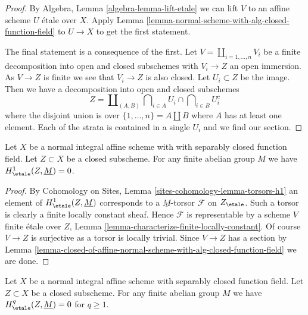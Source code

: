 \begin{proof}
By Algebra, Lemma \ref{algebra-lemma-lift-etale}
we can lift $V$ to an affine scheme $U$ \'etale over $X$.
Apply Lemma \ref{lemma-normal-scheme-with-alg-closed-function-field}
to $U \to X$ to get the first statement.

\medskip\noindent
The final statement is a consequence of the first.
Let $V = \coprod_{i = 1, \ldots, n} V_i$ be a finite
decomposition into open and
closed subschemes with $V_i \to Z$ an open immersion.
As $V \to Z$ is finite we see that $V_i \to Z$ is also closed.
Let $U_i \subset Z$ be the image. Then we have a decomposition
into open and closed subschemes
$$
Z =
\coprod\nolimits_{(A, B)}
\bigcap\nolimits_{i \in A} U_i \cap
\bigcap\nolimits_{i \in B} U_i^c
$$
where the disjoint union is over $\{1, \ldots, n\} = A \amalg B$
where $A$ has at least one element.
Each of the strata is contained in a single $U_i$ and
we find our section.
\end{proof}

\begin{lemma}
\label{lemma-gabber-for-h1-absolutely-algebraically-closed}
Let $X$ be a normal integral affine scheme with with separably closed
function field. Let $Z \subset X$ be a closed subscheme.
For any finite abelian group $M$ we have $H^1_\etale(Z, \underline{M}) = 0$.
\end{lemma}

\begin{proof}
By Cohomology on Sites, Lemma \ref{sites-cohomology-lemma-torsors-h1}
an element of $H^1_\etale(Z, \underline{M})$ corresponds to a
$\underline{M}$-torsor $\mathcal{F}$ on $Z_\etale$.
Such a torsor is clearly a finite locally constant sheaf.
Hence $\mathcal{F}$ is representable by a scheme $V$ finite
\'etale over $Z$, Lemma \ref{lemma-characterize-finite-locally-constant}.
Of course $V \to Z$ is surjective as a torsor is locally trivial.
Since $V \to Z$ has a section by
Lemma \ref{lemma-closed-of-affine-normal-scheme-with-alg-closed-function-field}
we are done.
\end{proof}

\begin{lemma}
\label{lemma-gabber-for-absolutely-algebraically-closed}
Let $X$ be a normal integral affine scheme with separably closed
function field. Let $Z \subset X$ be a closed subscheme.
For any finite abelian group $M$ we have
$H^q_\etale(Z, \underline{M}) = 0$ for $q \geq 1$.
\end{lemma}

